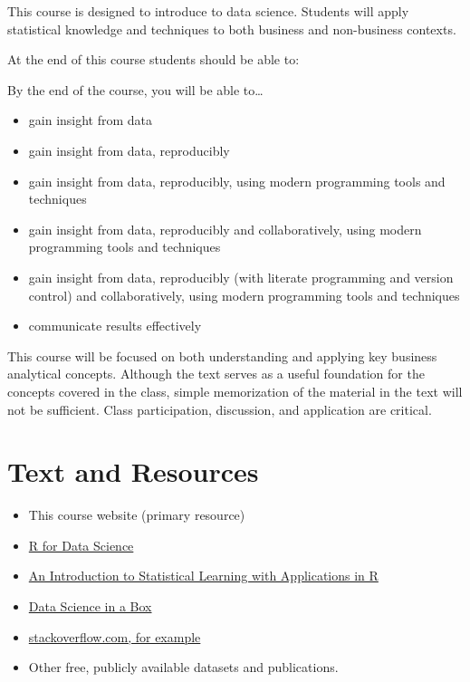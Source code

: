 \documentclass[
]{book}
\providecommand{\tightlist}{%
  \setlength{\itemsep}{0pt}\setlength{\parskip}{0pt}}
\theoremstyle{definition}
\theoremstyle{definition}
\theoremstyle{definition}
\theoremstyle{definition}
\theoremstyle{remark}
\begin{document}
This course is designed to introduce to data science. Students will apply statistical knowledge and techniques to both business and non-business contexts.

At the end of this course students should be able to:

By the end of the course, you will be able to\ldots{}

\begin{itemize}
\tightlist
\item
  gain insight from data
\item
  gain insight from data, reproducibly
\item
  gain insight from data, reproducibly, using modern programming tools and techniques
\item
  gain insight from data, reproducibly and collaboratively, using modern programming tools and techniques
\item
  gain insight from data, reproducibly (with literate programming and version control) and collaboratively, using modern programming tools and techniques
\item
  communicate results effectively
\end{itemize}

This course will be focused on both understanding and applying key business analytical concepts. Although the text serves as a useful foundation for the concepts covered in the class, simple memorization of the material in the text will not be sufficient. Class participation, discussion, and application are critical.

\hypertarget{text-and-resources}{%
\section{Text and Resources}\label{text-and-resources}}

\begin{itemize}
\tightlist
\item
  This course website (primary resource)
\item
  \href{https://r4ds.had.co.nz/}{R for Data Science}
\item
  \href{https://trevorhastie.github.io/ISLR/}{An Introduction to Statistical Learning with Applications in R}
\item
  \href{https://datasciencebox.org/}{Data Science in a Box}
\item
  \href{https://stackoverflow.com/questions/4862178/remove-rows-with-all-or-some-nas-missing-values-in-data-frame?rq=1}{stackoverflow.com, for example}
\item
  Other free, publicly available datasets and publications.
\end{itemize}
\end{document}

